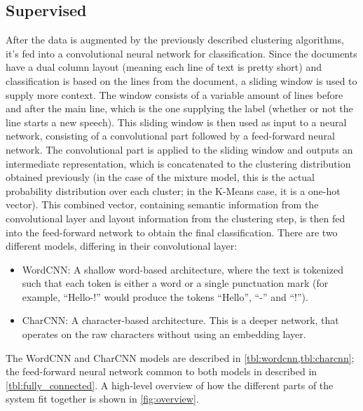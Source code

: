 \subsection{Supervised}%
\label{sec:sup}
After the data is augmented by the previously described clustering algorithms,
it's fed into a convolutional neural network for classification. Since the
documents have a dual column layout (meaning each line of text is pretty short)
and classification is based on the lines from the document, a sliding window is
used to supply more context. The window consists of a variable amount of lines
before and after the main line, which is the one supplying the label (whether
or not the line starts a new speech). This sliding window is then used as input
to a neural network, consisting of a convolutional part followed by a
feed-forward neural network. The convolutional part is applied to the sliding
window and outputs an intermediate
representation, which is concatenated to the clustering distribution
obtained previously (in the case of the mixture model, this is the actual
probability distribution over each cluster; in the K-Means case, it is a
one-hot vector). This combined vector, containing semantic information from the
convolutional layer and layout information from the clustering step, is then fed
into the feed-forward network to obtain the final classification.
There are two different models, differing in their convolutional layer:
\begin{itemize}
  \item WordCNN: A shallow word-based architecture\citep{kim2014conv}, where the
  text is tokenized such that each token is either a word or a single punctuation
  mark (for example, ``Hello-!'' would produce the tokens ``Hello'', ``-'' and
  ``!'').
  \item CharCNN: A character-based architecture\citep{zhang2015character}. This
  is a deeper network, that operates on the raw characters without using an
  embedding layer.
\end{itemize}
The WordCNN and CharCNN models are described in \cref{tbl:wordcnn,tbl:charcnn};
the feed-forward neural network common to both models in described in
\cref{tbl:fully_connected}. A high-level overview of how the different parts
of the system fit together is shown in \cref{fig:overview}.

